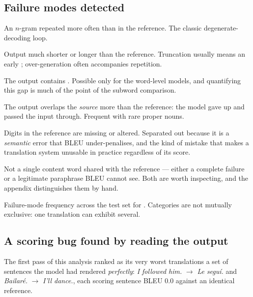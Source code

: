\documentclass[11pt,a4paper]{article}
\begin{document}
\subsection{Failure modes detected}

\begin{description}[leftmargin=1.6cm,style=nextline]
  \item[repetition] An $n$-gram repeated more often than in the reference. The
    classic degenerate-decoding loop.
  \item[truncation / over-generation] Output much shorter or longer than the
    reference. Truncation usually means an early ; over-generation
    often accompanies repetition.
  \item[unknown\_token] The output contains . Possible only for the
    word-level models, and quantifying this gap is much of the point of the
    subword comparison.
  \item[copied\_source] The output overlaps the \emph{source} more than the
    reference: the model gave up and passed the input through. Frequent with
    rare proper nouns.
  \item[number\_mismatch] Digits in the reference are missing or altered.
    Separated out because it is a \emph{semantic} error that BLEU
    under-penalises, and the kind of mistake that makes a translation system
    unusable in practice regardless of its score.
  \item[no\_content\_overlap] Not a single content word shared with the
    reference --- either a complete failure or a legitimate paraphrase BLEU
    cannot see. Both are worth inspecting, and the appendix distinguishes them
    by hand.
\end{description}

\begin{table}[htbp]
\centering
\caption{Failure-mode frequency across the test set for \PrimaryRun. Categories
are not mutually exclusive: one translation can exhibit several.}
\label{tab:errors}
\small

\end{table}


\subsection{A scoring bug found by reading the output}

The first pass of this analysis ranked as its very worst translations a set of
sentences the model had rendered \emph{perfectly}: \emph{I followed him.} $\to$
\emph{Le seguí.} and \emph{Bailaré.} $\to$ \emph{I'll dance.}, each scoring
sentence BLEU 0.0 against an identical reference.
\end{document}
